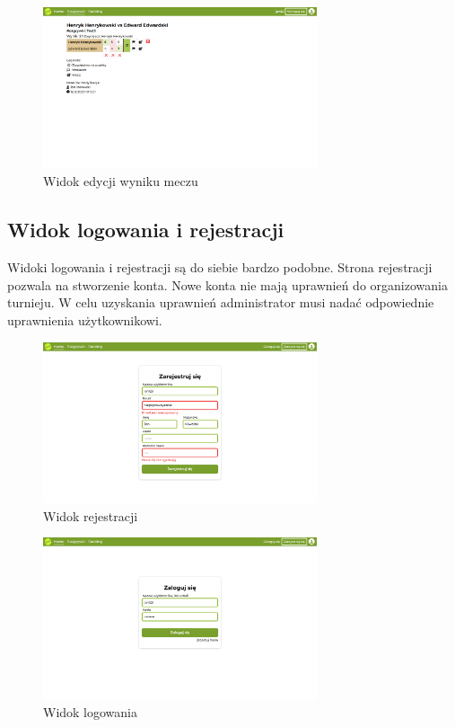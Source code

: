 \documentclass[shortabstract]{iithesis}
\begin{document}
\begin{figure}[H]
    \centering
    \includegraphics[width=0.72\textwidth,valign=t]{assets/interfejs/mecz_desktop.png}
    \caption{Widok edycji wyniku meczu}
\end{figure}

\subsection{Widok logowania i rejestracji}
Widoki logowania i rejestracji są do siebie bardzo podobne.
Strona rejestracji pozwala na stworzenie konta. Nowe konta nie mają uprawnień do organizowania turnieju.
W celu uzyskania uprawnień administrator musi nadać odpowiednie uprawnienia użytkownikowi.
\begin{figure}[H]
    \centering
    \includegraphics[width=0.72\textwidth,valign=t]{assets/interfejs/rejestracja_desktop.png}
    \caption{Widok rejestracji}
\end{figure}

\begin{figure}[H]
    \centering
    \includegraphics[width=0.72\textwidth,valign=t]{assets/interfejs/logowanie_desktop.png}
    \caption{Widok logowania}
\end{figure}
\end{document}
